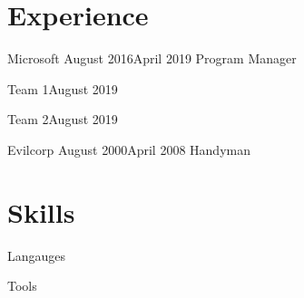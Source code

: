 \documentclass[]{../resume}
\author{Caleb Thorsteinson}
\begin{document}

\section{Experience}

\begin{employer}{Microsoft} {August 2016}{April 2019} {Program Manager}
  \begin{teams}
    \begin{team}{Team 1}{August 2019}
        \lipsum[1]
    \end{team}
    \begin{team}{Team 2}{August 2019}
        \lipsum[2]
    \end{team}
  \end{teams}
\end{employer}

\begin{employer}{Evilcorp} {August 2000}{April 2008} {Handyman}
  \lipsum[5]
\end{employer}

\newcolumn


\section{Skills}

\begin{skilltable}{Langauges}
\end{skilltable}

\begin{skilltable}{Tools}
\end{skilltable}
    
\end{document}
